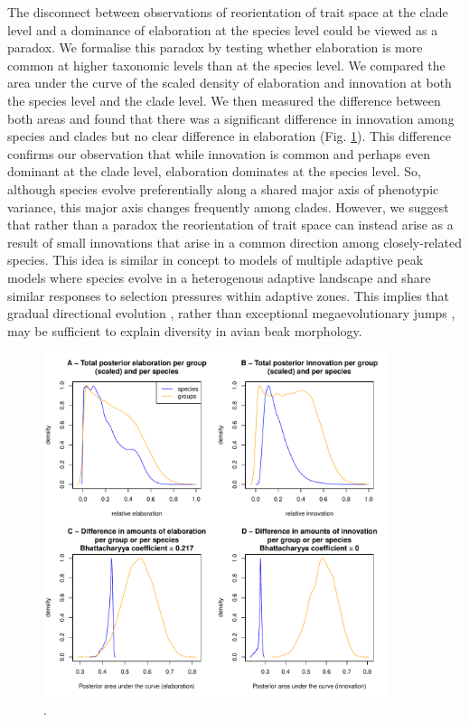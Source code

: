 \documentclass[12pt,letterpaper]{article}
\begin{document}
The disconnect between observations of reorientation of trait space at the clade level and a dominance of elaboration at the species level could be viewed as a paradox.
We formalise this paradox by testing whether elaboration is more common at higher taxonomic levels than at the species level.
We compared the area under the curve of the scaled density of elaboration and innovation at both the species level and the clade level.
We then measured the difference between both areas and found that there was a significant difference in innovation among species and clades but no clear difference in elaboration (Fig. \ref{Fig:relative_EI}).
This difference confirms our observation that while innovation is common and perhaps even dominant at the clade level, elaboration dominates at the species level. So, although species evolve preferentially along a shared major axis of phenotypic variance, this major axis changes frequently among clades.
However, we suggest that rather than a paradox the reorientation of trait space can instead arise as a result of small innovations that arise in a common direction among closely-related species.
This idea is similar in concept to models of multiple adaptive peak models where species evolve in a heterogenous adaptive landscape and share similar responses to selection pressures within adaptive zones.
This implies that gradual directional evolution \cite{pagel2022general}, rather than exceptional megaevolutionary jumps \cite{cooney2017mega,venditti2011multiple}, may be sufficient to explain diversity in avian beak morphology.

\begin{figure}[!htbp]
\centering
   \includegraphics[width=0.9\textwidth]{Figures/relative_EI.pdf}
\caption{.}
\label{Fig:relative_EI}
\end{figure}
\end{document}
